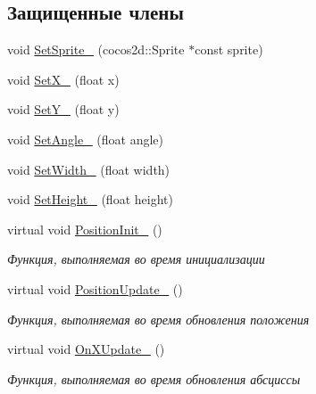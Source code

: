 \subsection*{Защищенные члены}
\begin{DoxyCompactItemize}
\item 
void \hyperlink{classrtm_1_1_world_object_ae8f0605c11c95bf6eae8f42c24fc4130}{Set\+Sprite\+\_\+} (cocos2d\+::\+Sprite $\ast$const sprite)
\item 
void \hyperlink{classrtm_1_1_world_object_a66fcf7be3345584be9f06e00a79da559}{Set\+X\+\_\+} (float x)
\item 
void \hyperlink{classrtm_1_1_world_object_a2d9de0f03e711f7b2486889d7336c9d3}{Set\+Y\+\_\+} (float y)
\item 
void \hyperlink{classrtm_1_1_world_object_a3185c36d5138dde6f6942b101586cee4}{Set\+Angle\+\_\+} (float angle)
\item 
void \hyperlink{classrtm_1_1_world_object_ad11ace9402b562b5c2aa6817c4b1cc9f}{Set\+Width\+\_\+} (float width)
\item 
void \hyperlink{classrtm_1_1_world_object_a60904037c13f9cf151cd28f040ac5f02}{Set\+Height\+\_\+} (float height)
\item 
\mbox{\label{classrtm_1_1_world_object_a4adc266618f3aeb94ae55df76f0716dc}} 
virtual void \hyperlink{classrtm_1_1_world_object_a4adc266618f3aeb94ae55df76f0716dc}{Position\+Init\+\_\+} ()
\begin{DoxyCompactList}\small\item\em Функция, выполняемая во время инициализации \end{DoxyCompactList}\item 
\mbox{\label{classrtm_1_1_world_object_a1619ffa3020e1cf19c901635fd3c4b88}} 
virtual void \hyperlink{classrtm_1_1_world_object_a1619ffa3020e1cf19c901635fd3c4b88}{Position\+Update\+\_\+} ()
\begin{DoxyCompactList}\small\item\em Функция, выполняемая во время обновления положения \end{DoxyCompactList}\item 
\mbox{\label{classrtm_1_1_world_object_ac1094406fc176bd4ae14dfb3f081b7f5}} 
virtual void \hyperlink{classrtm_1_1_world_object_ac1094406fc176bd4ae14dfb3f081b7f5}{On\+X\+Update\+\_\+} ()
\begin{DoxyCompactList}\small\item\em Функция, выполняемая во время обновления абсциссы \end{DoxyCompactList}\item 

\end{DoxyCompactItemize}
